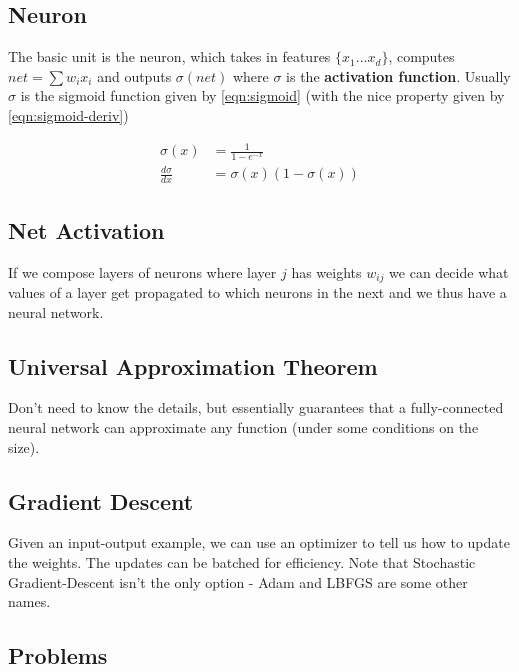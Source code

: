 \documentclass[11pt]{report}
\begin{document}
\subsection{Neuron}
The basic unit is the neuron, which takes in features $\{x_1...x_d\}$, computes $net = \sum w_ix_i$ and outputs $\sigma(net)$ where $\sigma$ is the \textbf{activation function}. Usually $\sigma$ is the sigmoid function given by \autoref{eqn:sigmoid} (with the nice property given by \autoref{eqn:sigmoid-deriv})

\begin{align}
	\label{eqn:sigmoid}
	\sigma(x) &= \frac{1}{1 - e^{-x}}\\
	\label{eqn:sigmoid-deriv}
	\frac{d\sigma}{dx} &= \sigma(x)(1-\sigma(x))
\end{align}

\subsection{Net Activation}

If we compose layers of neurons where layer $j$ has weights $w_{ij}$ we can decide what values of a layer get propagated to which neurons in the next and we thus have a neural network.

\subsection{Universal Approximation Theorem}
Don't need to know the details, but essentially guarantees that a fully-connected neural network can approximate any function (under some conditions on the size).

\subsection{Gradient Descent}
Given an input-output example, we can use an optimizer to tell us how to update the weights. The updates can be batched for efficiency. Note that Stochastic Gradient-Descent isn't the only option - Adam and LBFGS are some other names.

\subsection{Problems}
\end{document}

